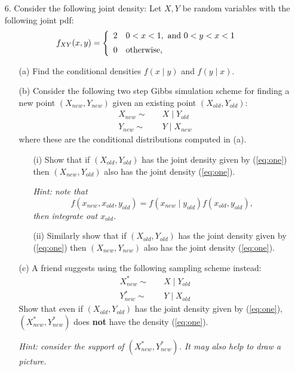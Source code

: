 \documentclass{article}
\newcommand{\1}{\mathbf{1}}
\begin{document}
\begin{enumerate}
\item[6.] Consider the following joint density:
Let  $X,Y$ be random variables with the following joint pdf:
\begin{equation}\label{eq:one}
f_{XY}(x,y) = \left\{  \begin{array}{cl}
2 &   0< x <1,\hbox{ and } 0 < y < x < 1 \\[5pt]
0   & \hbox{otherwise,}
\end{array}
  \right.
\end{equation}
\begin{enumerate}
\item[(a)] Find the conditional densities $f(x\mid y)$ and $f(y \mid x)$.
\item [(b)] Consider the following two step Gibbs simulation scheme for finding a new point
$(X_{new}, Y_{new})$ given an existing point $(X_{old}, Y_{old})$:
\begin{align*}
X_{new} \sim&\quad X \mid Y_{old}\\
Y_{new} \sim&\quad Y \mid X_{new}
\end{align*}
where these are the conditional distributions computed in (a).

\begin{enumerate}
\item[(i)] Show that if $(X_{old},Y_{old})$ has the joint density given by (\ref{eq:one})
then $(X_{new},Y_{old})$ also has the joint density  (\ref{eq:one}).\par
{\it Hint: note that 
\[
f(x_{new},x_{old},y_{old}) = f(x_{new}\mid y_{old})f(x_{old},y_{old}),
\]
then integrate out $x_{old}$.}
\item[(ii)] Similarly show that if $(X_{old},Y_{old})$ has the joint density given by (\ref{eq:one})
then  $(X_{new},Y_{new})$ also has the joint density  (\ref{eq:one}).
\end{enumerate}
\item[(c)] A friend  suggests using the following sampling scheme instead:
\begin{align*}
X^*_{new} \sim &\quad  X \mid Y_{old}\\
Y^*_{new} \sim &\quad Y \mid X_{old}
\end{align*}
Show that even  if $(X_{old},Y_{old})$ has the joint density given by (\ref{eq:one}),
$(X^*_{new},Y^*_{new})$ does {\bf not} have the density (\ref{eq:one}).\par
{\it Hint: consider the support of $(X^*_{new},Y^*_{new})$. It may also help to draw a picture.}

\end{enumerate}
\end{enumerate}
\end{document}
